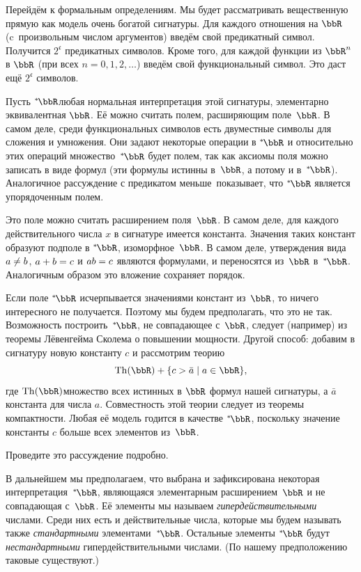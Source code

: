 Перейдём к формальным определениям. Мы будет рассматривать
вещественную прямую как модель очень богатой сигнатуры. Для
каждого отношения на $\bbR$ (c~произвольным числом аргументов)
введём свой предикатный символ. Получится $2^{\mathfrak{c}}$
предикатных символов. Кроме того, для каждой функции из $\bbR^n$
в $\bbR$ (при всех $n=0,1,2,\dots$) введём свой функциональный
символ. Это даст ещё $2^{\mathfrak{c}}$ символов.

Пусть $\nstR$\т любая нормальная интерпретация этой сигнатуры,
элементарно эквивалентная%
$\bbR$. Её можно считать полем,
расширяющим поле~$\bbR$. В самом деле, среди функциональных
символов есть двуместные символы для сложения и умножения. Они
задают некоторые операции в $\nstR$ и относительно этих операций
множество~$\nstR$ будет полем, так как аксиомы поля можно
записать в виде формул (эти формулы истинны в~$\bbR$, а потому и
в~$\nstR$). Аналогичное рассуждение с предикатом  меньше\
показывает, что $\nstR$ является упорядоченным полем.

Это поле можно считать расширением поля~$\bbR$. В самом деле,
для каждого действительного числа $x$ в сигнатуре имеется
константа. Значения таких констант образуют подполе в $\nstR$,
изоморфное~$\bbR$. В самом деле, утверждения вида $a\hm\ne b$,
$a+b\hm=c$ и $ab\hm=c$ являются формулами, и переносятся
из~$\bbR$ в~$\nstR$. Аналогичным образом это вложение сохраняет
порядок.

Если поле $\nstR$ исчерпывается значениями констант из~$\bbR$,
то ничего интересного не получается. Поэтому мы будем
предполагать, что это не так. Возможность построить~$\nstR$, не
совпадающее с~$\bbR$, следует (например) из теоремы Лёвенгейма\ч
Сколема о повышении мощности.%
Другой способ: добавим в сигнатуру
новую константу $c$ и рассмотрим теорию
         $$
\Th(\bbR)+\{c>\bar a\mid a\in\bbR\},
         $$
где $\Th(\bbR)$\т множество всех истинных в $\bbR$ формул нашей
сигнатуры, а $\bar a$\т константа для числа $a$. Совместность
этой теории следует из теоремы компактности.%
Любая
её модель годится в качестве $\nstR$, поскольку значение
константы $c$ больше всех элементов из~$\bbR$.

\begin{problem}
Проведите это рассуждение подробно.
\end{problem}

В дальнейшем мы предполагаем, что выбрана и зафиксирована
некоторая интерпретация~$\nstR$, являющаяся элементарным
расширением~$\bbR$ и не совпадающая с~$\bbR$. Её элементы мы
называем \emph{гипердействительными}%
числами.
Среди них есть и действительные числа, которые мы будем называть
также \emph{стандартными}%
элементами~$\nstR$. Остальные элементы $\nstR$
будут \emph{нестандартными}%
гипердействительными числами. (По нашему предположению таковые
существуют.)

